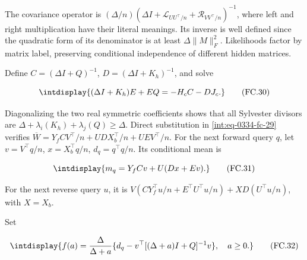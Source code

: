
The covariance operator is \((\Delta/n) (\Delta I+\mathcal L_{UU^\top/n}+\mathcal R_{VV^\top/n})^{-1}\), where left and right multiplication have their literal meanings. Its inverse is well defined since the quadratic form of its denominator is at least \(\Delta\|M\|_F^2\). Likelihoods factor by matrix label, preserving conditional independence of different hidden matrices.



Define \(C=(\Delta I+Q)^{-1}\), \(D=(\Delta I+K_h)^{-1}\), and solve


\begingroup\renewcommand{\theHequation}{intdisplay.731}
\begin{equation}
\intdisplay{
(\Delta I+K_h)E+EQ=-H_cC-DJ_c.
}
\tag{FC.30}
\label{int:eq-0335-fc-30}
\end{equation}
\endgroup


Diagonalizing the two real symmetric coefficients shows that all Sylvester divisors are \(\Delta+\lambda_i(K_h)+\lambda_j(Q)\ge\Delta\). Direct substitution in \eqref{int:eq-0334-fc-29} verifies \(\overline W=Y_fCV^\top/n+UDX_b^\top/n+UEV^\top/n\). For the next forward query \(q\), let \(v=V^\top q/n\), \(x=X_b^\top q/n\), \(d_q=q^\top q/n\). Its conditional mean is


\begingroup\renewcommand{\theHequation}{intdisplay.732}
\begin{equation}
\intdisplay{
m_q=Y_fCv+U(Dx+Ev).
}
\tag{FC.31}
\label{int:eq-0336-fc-31}
\end{equation}
\endgroup


For the next reverse query \(u\), it is \(V(CY_f^\top u/n+E^\top U^\top u/n)+XD(U^\top u/n)\), with \(X=X_b\).



Set


\begingroup\renewcommand{\theHequation}{intdisplay.733}
\begin{equation}
\intdisplay{
f(a)=\frac\Delta{\Delta+a}
\{d_q-v^\top[(\Delta+a)I+Q]^{-1}v\},\quad a\ge0.
}
\tag{FC.32}
\label{int:eq-0337-fc-32}
\end{equation}
\endgroup



